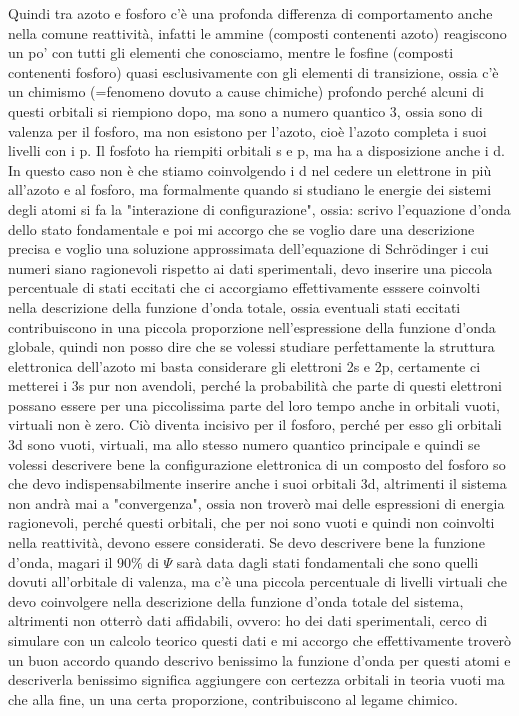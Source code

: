 Quindi tra azoto e fosforo c'è una profonda differenza di comportamento anche nella comune reattività, infatti le ammine (composti contenenti azoto) reagiscono un po' con tutti gli elementi che conosciamo, mentre le fosfine (composti contenenti fosforo) quasi esclusivamente con gli elementi di transizione, ossia c'è un chimismo (=fenomeno dovuto a cause chimiche) profondo perché alcuni di questi orbitali si riempiono dopo, ma sono a numero quantico 3, ossia sono di valenza per il fosforo, ma non esistono per l'azoto, cioè l'azoto completa i suoi livelli con i p. Il fosfoto ha riempiti orbitali s e p, ma ha a disposizione anche i d. In questo caso non è che stiamo coinvolgendo i d nel cedere un elettrone in più all'azoto e al fosforo, ma formalmente quando si studiano le energie dei sistemi degli atomi si fa la "interazione di configurazione", ossia: scrivo l'equazione d'onda dello stato fondamentale e poi mi accorgo che se voglio dare una descrizione precisa e voglio una soluzione approssimata dell'equazione di Schrödinger i cui numeri siano ragionevoli rispetto ai dati sperimentali, devo inserire una piccola percentuale di stati eccitati che ci accorgiamo effettivamente esssere coinvolti nella descrizione della funzione d'onda totale, ossia eventuali stati eccitati contribuiscono in una piccola proporzione nell'espressione della funzione d'onda globale, quindi non posso dire che se volessi studiare perfettamente la struttura elettronica dell'azoto mi basta considerare gli elettroni 2s e 2p, certamente ci metterei i 3s pur non avendoli, perché la probabilità che parte di questi elettroni possano essere per una piccolissima parte del loro tempo anche in orbitali vuoti, virtuali non è zero. Ciò diventa incisivo per il fosforo, perché per esso gli orbitali 3d sono vuoti, virtuali, ma allo stesso numero quantico principale e quindi se volessi descrivere bene la configurazione elettronica di un composto del fosforo so che devo indispensabilmente inserire anche i suoi orbitali 3d, altrimenti il sistema non andrà mai a "convergenza", ossia non troverò mai delle espressioni di energia ragionevoli, perché questi orbitali, che per noi sono vuoti e quindi non coinvolti nella reattività, devono essere considerati. Se devo descrivere bene la funzione d'onda, magari il 90\% di $\Psi$ sarà data dagli stati fondamentali che sono quelli dovuti all'orbitale di valenza, ma c'è una piccola percentuale di livelli virtuali che devo coinvolgere nella descrizione della funzione d'onda totale del sistema, altrimenti non otterrò dati affidabili, ovvero: ho dei dati sperimentali, cerco di simulare con un calcolo teorico questi dati e mi accorgo che effettivamente troverò un buon accordo quando descrivo benissimo la funzione d'onda per questi atomi e descriverla benissimo significa aggiungere con certezza orbitali in teoria vuoti ma che alla fine, un una certa proporzione, contribuiscono al legame chimico.

